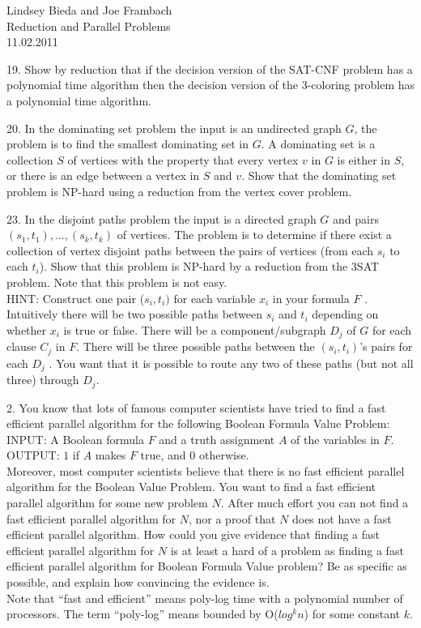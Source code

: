 \documentclass[10pt]{article}
\begin{document}
	\begin{flushright}
	Lindsey Bieda and Joe Frambach\\
	Reduction and Parallel Problems\\
	11.02.2011
	\end{flushright}
19. Show by reduction that if the decision version of the SAT-CNF problem has a polynomial time algorithm
then the decision version of the 3-coloring problem has a polynomial time algorithm.
\newpage

20. In the dominating set problem the input is an undirected graph $G$, the problem is to find the smallest
dominating set in $G$. A dominating set is a collection $S$ of vertices with the property that every vertex
$v$ in $G$ is either in $S$, or there is an edge between a vertex in $S$ and $v$. Show that the dominating set
problem is NP-hard using a reduction from the vertex cover problem.
\newpage

23. In the disjoint paths problem the input is a directed graph $G$ and pairs $(s_1, t_1), \ldots, (s_k, t_k)$ of vertices.
The problem is to determine if there exist a collection of vertex disjoint paths between the pairs of
vertices (from each $s_i$ to each $t_i$). Show that this problem is NP-hard by a reduction from the 3SAT
problem. Note that this problem is not easy.\\
HINT: Construct one pair ($s_i, t_i)$ for each variable $x_i$ in your formula $F$ . Intuitively there will be
two possible paths between $s_i$ and $t_i$ depending on whether $x_i$ is true or false. There will be a
component/subgraph $D_j$ of $G$ for each clause $C_j$ in $F$. There will be three possible paths between the
$(s_i, t_i)$'s pairs for each $D_j$ . You want that it is possible to route any two of these paths (but not all
three) through $D_j$.
\newpage

2. You know that lots of famous computer scientists have tried to find a fast efficient parallel algorithm
for the following Boolean Formula Value Problem:\\
INPUT: A Boolean formula $F$ and a truth assignment $A$ of the variables in $F$.\\
OUTPUT: $1$ if $A$ makes $F$ true, and $0$ otherwise.\\
Moreover, most computer scientists believe that there is no fast efficient parallel algorithm for the
Boolean Value Problem. You want to find a fast efficient parallel algorithm for some new problem $N$.
After much effort you can not find a fast efficient parallel algorithm for $N$, nor a proof that $N$ does
not have a fast efficient parallel algorithm. How could you give evidence that finding a fast efficient
parallel algorithm for $N$ is at least a hard of a problem as finding a fast efficient parallel algorithm for
Boolean Formula Value problem? Be as specific as possible, and explain how convincing the evidence
is.\\
Note that ``fast and efficient'' means poly-log time with a polynomial number of processors. The term
``poly-log'' means bounded by O($log^kn$) for some constant $k$.
\newpage
\end{document}
